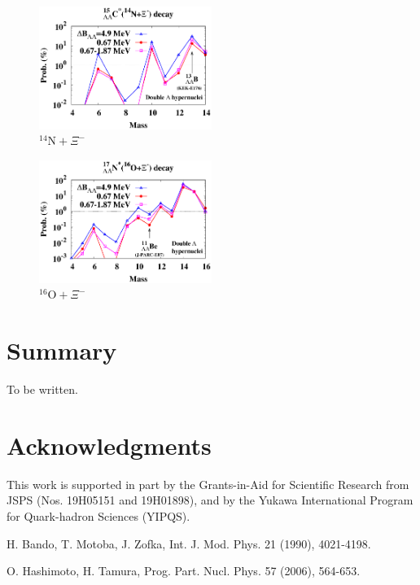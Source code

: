 \documentclass{ptephy_v1}
\begin{document}
\begin{figure}[htbp]
\begin{center}
\includegraphics[width=0.5\textwidth]{N14Xi-cas.eps}%
\end{center}
\caption{
$^{14}\mathrm{N}+\Xi^-$
}
\label{Fig:N14Xi}
\end{figure}

\begin{figure}[htbp]
\begin{center}
\includegraphics[width=0.5\textwidth]{O16Xi-cas.eps}%
\end{center}
\caption{
$^{16}\mathrm{O}+\Xi^-$
}
\label{Fig:O16Xi}
\end{figure}


\section{Summary}
\label{Sec:Summary}

To be written.

\section*{Acknowledgments}
This work is supported in part by the Grants-in-Aid for Scientific Research
 from JSPS (Nos. 
19H05151 %
and
19H01898), %
%
and by the Yukawa International Program for Quark-hadron Sciences (YIPQS).



%
\begin{thebibliography}{99}
H. Bando, T. Motoba, J. Zofka, Int. J. Mod. Phys. 21 (1990), 4021-4198.

O. Hashimoto, H. Tamura, Prog. Part. Nucl. Phys. 57 (2006), 564-653.
\end{thebibliography}
\end{document}
